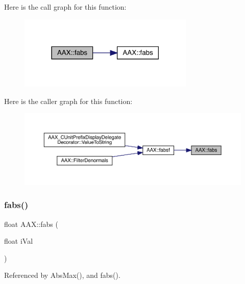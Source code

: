 Here is the call graph for this function\+:
\nopagebreak
\begin{figure}[H]
\begin{center}
\leavevmode
\includegraphics[width=237pt]{a00852_aa4fa4d0765a764b020102cdbff8b45b0_cgraph}
\end{center}
\end{figure}
Here is the caller graph for this function\+:
\nopagebreak
\begin{figure}[H]
\begin{center}
\leavevmode
\includegraphics[width=350pt]{a00852_aa4fa4d0765a764b020102cdbff8b45b0_icgraph}
\end{center}
\end{figure}
\mbox{\label{a00852_af486dfb226661e4a47d7b42eca881759}} 
\subsubsection{\texorpdfstring{fabs()}{fabs()}\hspace{0.1cm}{\footnotesize\ttfamily [2/2]}}
{\footnotesize\ttfamily float A\+A\+X\+::fabs (\begin{DoxyParamCaption}\item[{float}]{i\+Val }\end{DoxyParamCaption})\hspace{0.3cm}{\ttfamily [inline]}}



Referenced by Abs\+Max(), and fabs().

